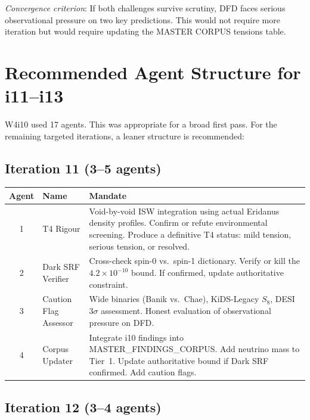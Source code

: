 \documentclass[11pt]{article}
\newcommand{\ee}[1]{\times 10^{#1}}
\begin{document}
\begin{tcolorbox}[colback=red!3!white, colframe=red!60!black,
  title=\textbf{TOP 5 OPEN QUESTIONS}]
\begin{enumerate}
  \emph{Convergence criterion}: If both challenges survive scrutiny,
  DFD faces serious observational pressure on two key predictions.
  This would not require more iteration but would require updating
  the MASTER CORPUS tensions table.
\end{enumerate}
\end{tcolorbox}


\section{Recommended Agent Structure for i11--i13}
\label{sec:agents}

W4i10 used 17 agents. This was appropriate for a broad first pass.
For the remaining targeted iterations, a leaner structure is recommended:

\subsection{Iteration 11 (3--5 agents)}

\begin{table}[H]
\centering
\begin{tabular}{clp{7.5cm}}
\toprule
\textbf{Agent} & \textbf{Name} & \textbf{Mandate} \\
\midrule
1 & T4 Rigour & Void-by-void ISW integration using actual Eridanus
  density profiles. Confirm or refute environmental screening. Produce
  a definitive T4 status: mild tension, serious tension, or resolved. \\
2 & Dark SRF Verifier & Cross-check spin-0 vs.\ spin-1 dictionary.
  Verify or kill the $4.2\ee{-10}$ bound. If confirmed, update authoritative
  constraint. \\
3 & Caution Flag Assessor & Wide binaries (Banik vs.\ Chae), KiDS-Legacy
  $S_8$, DESI $3\sigma$ assessment. Honest evaluation of observational
  pressure on DFD. \\
4 & Corpus Updater & Integrate i10 findings into MASTER\_FINDINGS\_CORPUS.
  Add neutrino mass to Tier~1. Update authoritative bound if Dark SRF
  confirmed. Add caution flags. \\
\bottomrule
\end{tabular}
\end{table}

\subsection{Iteration 12 (3--4 agents)}
\end{document}
